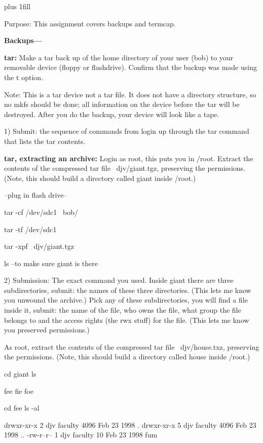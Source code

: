 
\rightskip=0pt plus 1fill

\parindent 0pt

Purpose: This assignment covers backups and termcap.

{\bf Backups---}

{\bf tar:}
Make a tar back up of the home directory of your user (bob) to your 
removable device (floppy or flashdrive).
Confirm that the backup was made using the {\ltt{}t} option.

Note: This is a tar device not a tar file. It does not have a 
directory structure, so no mkfs should be done; 
all information on the device before
the tar will be destroyed. After you do the backup, your
device will look like a tape.

1) Submit: the sequence of commands from login up through the
tar command that lists the tar contents.

{\bf tar, extracting an archive:}
Login as root, this puts you in {\ltt{}/root}.
Extract the contents of the compressed tar file {\ltt{}~djv/giant.tgz},
preserving the permissions.
(Note, this should build a directory called {\ltt{}giant} inside {\ltt{}/root}.)

--plug in flash drive--

tar -cf /dev/sdc1 ~bob/

tar -tf /dev/sdc1

tar -xpf ~djv/giant.tgz

ls --to make sure giant is there

2) Submission: The exact command you used.
Inside {\ltt{}giant} there are three subdirectories, submit: the names of
these three directories. (This lets me know you unwound the archive.)
Pick any of these subdirectories, you will find a file inside it,
submit: the name of the file, who owns the file, what group the file
belongs to and the access rights (the {\ltt{}rwx} stuff) for the file.
(This lets me know you preserved permissions.)

As root,
extract the contents of the compressed tar file {\ltt{}~djv/house.txz},
preserving the permissions.
(Note, this should build a directory called {\ltt{}house} inside {\ltt{}/root}.)

cd giant
ls

fee	fie	foe

cd fee
ls -al

drwxr-xr-x 2 djv faculty 4096 Feb 23 1998 .
drwxr-xr-x 5 djv faculty 4096 Feb 23 1998 ..
-rw-r--r-- 1 djv faculty   10 Feb 23 1998 fum

